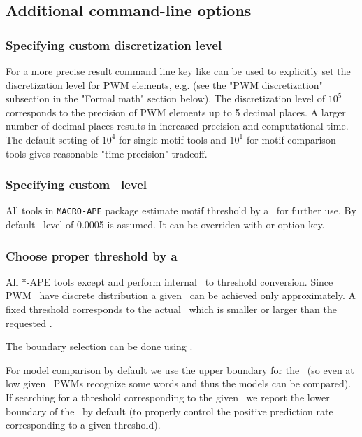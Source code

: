 \subsection{Additional command-line options}

\subsubsection{Specifying custom discretization level}
For a more precise result  command line key like can be used to explicitly set
the discretization level for PWM elements, e.g.  (see the "PWM discretization" subsection in the "Formal math" section below).
The discretization level of $10^5$ corresponds to the precision of PWM elements up to 5 decimal places.
A larger number of decimal places results in increased precision and computational time.
The default setting of $10^4$ for single-motif tools and $10^1$ for motif comparison tools gives reasonable "time-precision" tradeoff.

\subsubsection{Specifying custom \pvalue\ level}
All tools in \texttt{MACRO-APE} package estimate motif threshold by a \pvalue\ for further use. By default \pvalue\ level of 0.0005 is assumed.
It can be overriden with  or  option key.

\subsubsection{Choose proper threshold by a \pvalue}
All *-APE tools except  and  perform internal \pvalue\ to threshold conversion.
Since PWM \pvalues\ have discrete distribution a given \pvalue\ can be achieved only approximately.
A fixed threshold corresponds to the actual \pvalue\ which is smaller or larger than the requested \pvalue.

The boundary selection can be done using .

For model comparison by default we use the upper boundary for the \pvalue~(so even at low given \pvalues\ PWMs recognize some words and thus the models can be 
compared). If searching for a threshold corresponding to the given \pvalue\ we report the lower boundary of the \pvalue\ by default (to properly control
the positive prediction rate corresponding to a given threshold).

